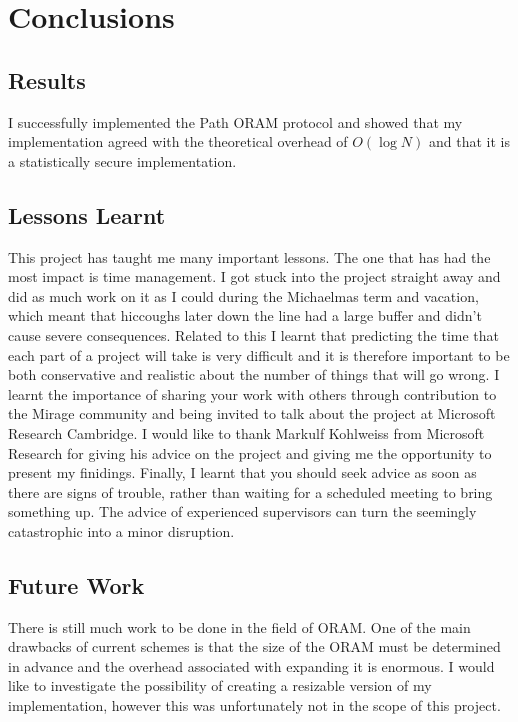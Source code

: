 \documentclass[12pt,a4paper,twoside,openright]{report}
\begin{document}
\chapter{Conclusions}

\section{Results}

I successfully implemented the Path ORAM protocol and showed that my implementation agreed with the theoretical overhead of $O(\log N)$ and that it is a statistically secure implementation.

\section{Lessons Learnt}

This project has taught me many important lessons. The one that has had the most impact is time management. I got stuck into the project straight away and did as much work on it as I could during the Michaelmas term and vacation, which meant that hiccoughs later down the line had a large buffer and didn't cause severe consequences. Related to this I learnt that predicting the time that each part of a project will take is very difficult and it is therefore important to be both conservative and realistic about the number of things that will go wrong. I learnt the importance of sharing your work with others through contribution to the Mirage community and being invited to talk about the project at Microsoft Research Cambridge. I would like to thank Markulf Kohlweiss from Microsoft Research for giving his advice on the project and giving me the opportunity to present my finidings. Finally, I learnt that you should seek advice as soon as there are signs of trouble, rather than waiting for a scheduled meeting to bring something up. The advice of experienced supervisors can turn the seemingly catastrophic into a minor disruption.

\section{Future Work}

There is still much work to be done in the field of ORAM. One of the main drawbacks of current schemes is that the size of the ORAM must be determined in advance and the overhead associated with expanding it is enormous. I would like to investigate the possibility of creating a resizable version of my implementation, however this was unfortunately not in the scope of this project.
\end{document}
